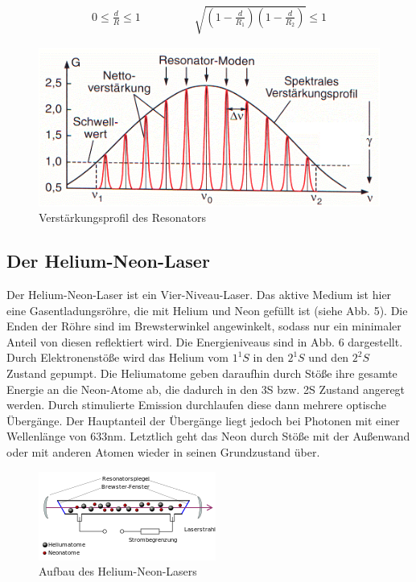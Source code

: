 \begin{align}
0\leq \frac{d}{R}\leq 1 \hspace{2cm} \sqrt{\left(1-\frac{d}{R_1}\right)\left(1-\frac{d}{R_2}\right)}\leq 1
\end{align}
 
\begin{figure}[h]
\begin{center}
\includegraphics[scale=0.4]{img/HNL6}
\caption{Verstärkungsprofil des Resonators}
\end{center}
\end{figure}

\subsection{Der Helium-Neon-Laser}
Der Helium-Neon-Laser ist ein Vier-Niveau-Laser. Das aktive Medium ist  hier eine Gasentladungsröhre, die mit Helium und Neon gefüllt ist (siehe  Abb. 5). Die Enden der Röhre sind im Brewsterwinkel angewinkelt, sodass nur ein minimaler Anteil von diesen reflektiert wird. Die Energieniveaus sind in Abb. 6 dargestellt. Durch Elektronenstöße wird das Helium vom $1^1S$ in den $2^1S$ und den $2^2S$ Zustand gepumpt. Die Heliumatome geben daraufhin durch Stöße ihre gesamte Energie an die Neon-Atome ab, die dadurch in den 3S bzw. 2S Zustand angeregt werden. Durch stimulierte Emission durchlaufen diese dann mehrere optische Übergänge. Der Hauptanteil der Übergänge liegt jedoch bei Photonen mit einer Wellenlänge von 633nm. Letztlich geht das Neon durch Stöße mit der Außenwand oder mit anderen Atomen wieder in seinen Grundzustand über.

\begin{figure}[h]
\begin{center}
\includegraphics[scale=0.7]{img/HNL7}
\caption{Aufbau des Helium-Neon-Lasers}
\end{center}
\end{figure}


